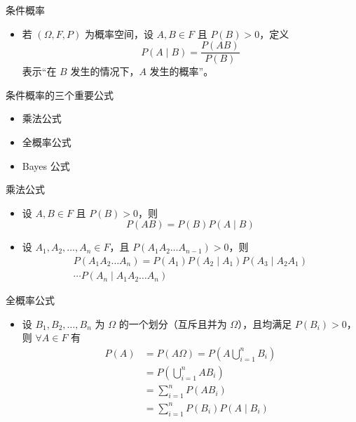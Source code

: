 \documentclass{beamer}
\begin{document}
    \begin{frame}{条件概率}
        \begin{itemize}
            \setlength{\itemsep}{10pt}
            \item 若 $(\Omega, F,P)$ 为概率空间，设 $A,B\in F$ 且 $P(B)>0$，定义
            $$
                P(A \mid B)=\frac{P(AB)}{P(B)}
            $$
            表示“在 $B$ 发生的情况下，$A$ 发生的概率”。

        \end{itemize}
    \end{frame}

    \begin{frame}{条件概率的三个重要公式}
        \begin{itemize}
            \setlength{\itemsep}{10pt}
            \item 乘法公式
            \item 全概率公式
            \item Bayes 公式
        \end{itemize}
    \end{frame}

    \begin{frame}{乘法公式}
        \begin{itemize}
            \setlength{\itemsep}{10pt}
            \item 设 $A,B \in F$ 且 $P(B)>0$，则
            $$
                P(AB)=P(B)P(A\mid B)
            $$
            \item 设 $A_1,A_2,\dots, A_n \in F$，且 $P(A_1A_2\dots A_{n-1})>0$，则
            \begin{gather*}
                P(A_1A_2 \dots A_n)=P(A_1)P(A_2\mid A_1)P(A_3 \mid A_2A_1) \\ 
                \cdots P(A_n \mid A_1A_2\dots A_n)
            \end{gather*}
        \end{itemize}
    \end{frame}

    \begin{frame}{全概率公式}
        \begin{itemize}
            \setlength{\itemsep}{10pt}
            \item 设 $B_1,B_2,\dots,B_n$ 为 $\Omega$ 的一个划分（互斥且并为 $\Omega$），且均满足 $P(B_i)>0$，则 $\forall A\in F$ 有
            \begin{align*}
                P(A)
                &= P(A\Omega) = P\left(A \bigcup_{i=1}^{n}B_i\right) \\
                &= P\left(\bigcup_{i=1}^{n} AB_i\right) \\
                &= \sum_{i=1}^{n} P(AB_i) \\
                &= \sum_{i=1}^{n} P(B_i)P(A \mid B_i)
            \end{align*}
        \end{itemize}
    \end{frame}
\end{document}
